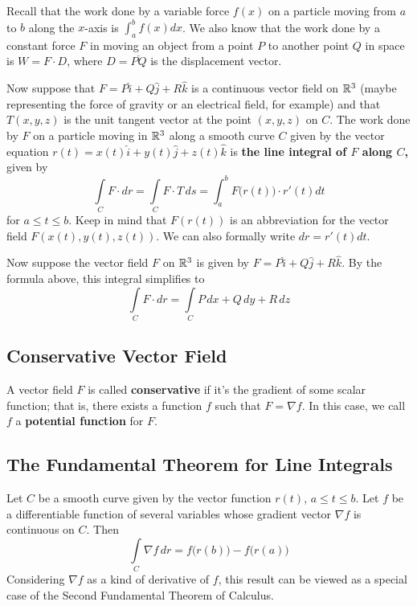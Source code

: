 Recall that the work done by a variable force $f(x)$ on a particle moving from $a$ to $b$ along the $x$-axis is $\int_a^b f(x) dx$. We also know that the work done by a constant force $F$ in moving an object from a point $P$ to another point $Q$ in space is $W = F \cdot D$, where $D = \overline{PQ}$ is the displacement vector.

Now suppose that $F = P \hat{i} + Q \hat{j} + R \hat{k}$ is a continuous vector field on $\mathbb{R}^3$ (maybe representing the force of gravity or an electrical field, for example) and that $T(x,y,z)$ is the unit tangent vector at the point $(x,y,z)$ on $C$. The work done by $F$ on a particle moving in $\mathbb{R}^3$ along a smooth curve $C$ given by the vector equation $r(t) = x(t)\hat{i} + y(t)\hat{j} + z(t)\hat{k}$ is \textbf{the line integral of $F$ along $C$,} given by $$ \int\limits_{C} F \cdot dr = \int\limits_{C} F \cdot T \, ds = \int_{a}^{b} F\big(r(t)\big) \cdot r'(t) dt$$ for $a \leq t \leq b$. Keep in mind that $F(r(t))$ is an abbreviation for the vector field $F(x(t), y(t), z(t))$. We can also formally write $dr = r'(t) dt$.

Now suppose the vector field $F$ on $\mathbb{R}^3$ is given by $F = P\hat{i} + Q\hat{j} + R\hat{k}$. By the formula above, this integral simplifies to $$ \int\limits_{C} F \cdot dr = \int\limits_{C} P \, dx + Q \, dy + R \, dz $$

\subsection{Conservative Vector Field}

A vector field $F$ is called \textbf{conservative} if it's the gradient of some scalar function; that is, there exists a function $f$ such that $F = \nabla f$. In this case, we call $f$ a \textbf{potential function} for $F$.

\subsection{The Fundamental Theorem for Line Integrals}

Let $C$ be a smooth curve given by the vector function $r(t)$, $a \leq t \leq b$. Let $f$ be a differentiable function of several variables whose gradient vector $\nabla f$ is continuous on $C$. Then $$ \int\limits_{C} \nabla f \, dr = f\big(r(b)\big) - f\big(r(a)\big) $$ Considering $\nabla f$ as a kind of derivative of $f$, this result can be viewed as a special case of the Second Fundamental Theorem of Calculus.

